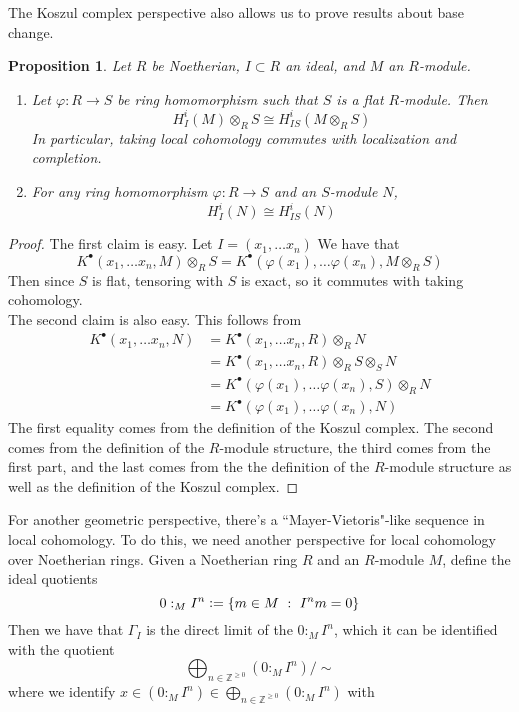 \documentclass[psamsfonts, 12pt]{amsart}
\newtheorem{prop}[thm]{Proposition}
\theoremstyle{definition}
\theoremstyle{remark}
\newcommand{\Z}{\mathbb{Z}}
\newcommand{\set}[1]{\left\lbrace #1 \right\rbrace}
\newcommand{\defeq}{\vcentcolon=}
\begin{document}
The Koszul complex perspective also allows us to prove results about base change.
%
\begin{prop}
Let $R$ be Noetherian, $I \subset R$ an ideal, and $M$ an $R$-module.
\begin{enumerate}
  \item Let $\varphi : R \to S$ be ring homomorphism such that $S$ is a flat $R$-module.
  Then
  \[
  H^i_I(M) \otimes_R S \cong H^i_{IS}(M \otimes_R S)
  \]
  In particular, taking local cohomology commutes with localization and completion.
  \item For any ring homomorphism $\varphi : R \to S$ and an $S$-module $N$,
  \[
  H^i_I(N) \cong H^i_{IS}(N)
  \]
\end{enumerate}
\end{prop}
%
\begin{proof}
The first claim is easy. Let $I = (x_1,\ldots x_n)$ We have that
\[
K^\bullet(x_1,\ldots x_n, M) \otimes_R S =
K^\bullet(\varphi(x_1),\ldots \varphi(x_n), M \otimes_R S)
\]
Then since $S$ is flat, tensoring with $S$ is exact, so it commutes with taking
cohomology. \\

The second claim is also easy. This follows from
\begin{align*}
K^\bullet(x_1,\ldots x_n, N) &= K^\bullet(x_1,\ldots x_n, R) \otimes_R N \\
&= K^\bullet(x_1,\ldots x_n,R) \otimes_R S \otimes_S N \\
&= K^\bullet(\varphi(x_1),\ldots \varphi(x_n), S) \otimes_R N \\
&= K^\bullet(\varphi(x_1),\ldots \varphi(x_n), N)
\end{align*}
The first equality comes from the definition of the Koszul complex. The second comes
from the  definition of the $R$-module structure, the third comes from the first part,
and the last comes from the the definition of the $R$-module structure
as well as the definition of the Koszul complex.
\end{proof}
%
For another geometric perspective, there's a ``Mayer-Vietoris"-like sequence in local
cohomology. To do this, we need another perspective for local cohomology over Noetherian
rings. Given a Noetherian ring $R$ and an $R$-module $M$, define the ideal quotients
\[
0:_M I^n \defeq \set{m \in M ~:~ I^nm =0}
\]
Then we have that $\Gamma_I$ is the direct limit of the $0:_M I^n$, which
it can be identified with the quotient
\[
\bigoplus_{n \in \Z^{\geq 0}} (0:_MI^n) / \sim
\]
where we identify $x \in (0 :_M I^n) \in \bigoplus_{n \in \Z^{\geq 0}} (0:_MI^n)$ with
\end{document}
